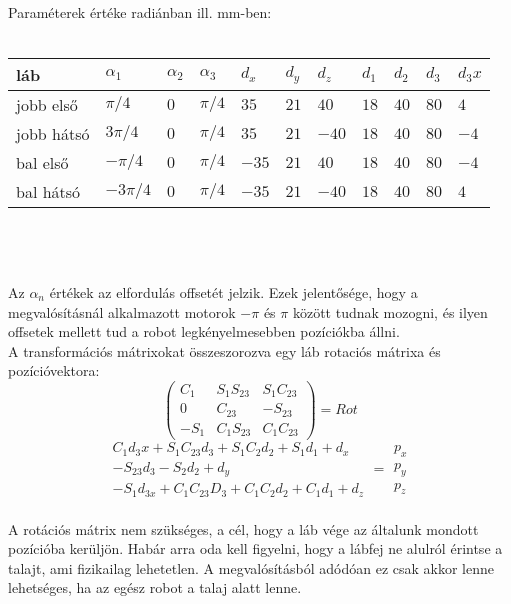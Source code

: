 \documentclass{article}
\begin{document}
	Paraméterek értéke radiánban ill. mm-ben:\\
	\\
	\begin{tabular}{ | l | l | l | l | l | l | l | l | l | l | l |}
		\hline
		láb&$\alpha_1$&$\alpha_2$&$\alpha_3$&$d_x$&$d_y$&$d_z$&$d_1$&$d_2$&$d_3$&$d_3x$\\
		\hline
		jobb első&$\pi/4$&$0$&$\pi/4$&$35$&$21$&$40$&$18$&$40$&$80$&$4$\\
		\hline
		jobb hátsó&$3\pi/4$&$0$&$\pi/4$&$35$&$21$&$-40$&$18$&$40$&$80$&$-4$\\
		\hline
		bal első&$-\pi/4$&$0$&$\pi/4$&$-35$&$21$&$40$&$18$&$40$&$80$&$-4$\\
		\hline
		bal hátsó&$-3\pi/4$&$0$&$\pi/4$&$-35$&$21$&$-40$&$18$&$40$&$80$&$4$\\
		\hline
	\end{tabular}\\
	\\
	\\
	Az $\alpha_n$ értékek az elfordulás offsetét jelzik. Ezek jelentősége, hogy a megvalósításnál alkalmazott motorok $-\pi$ és $\pi$ között tudnak mozogni, és ilyen offsetek mellett tud a robot legkényelmesebben pozíciókba állni.\\
	A transformációs mátrixokat összeszorozva egy láb rotaciós mátrixa és pozícióvektora:
	$$
	\begin{pmatrix}
	C_1&S_1S_{23}&S_1C_{23}\\
	0&C_{23}&-S_{23}\\
	-S_1&C_1S_{23}&C_1C_{23}
	\end{pmatrix}
	=
	Rot
	$$
	$$
	\begin{matrix}
	C_1d_3x+S_1C_{23}d_3+S_1C_2d_2+S_1d_1+d_x\\
	-S_{23}d_3-S_2d_2+d_y\\
	-S_1d_{3x}+C_1C_{23}D_3+C_1C_2d_2+C_1d_1+d_z
	\end{matrix}
	=
	\begin{matrix}
	p_x\\
	p_y\\
	p_z
	\end{matrix}
	$$
	\\
	A rotációs mátrix nem szükséges, a cél, hogy a láb vége az általunk mondott pozícióba kerüljön. Habár arra oda kell figyelni, hogy a lábfej ne alulról érintse a talajt, ami fizikailag lehetetlen. A megvalósításból adódóan ez csak akkor lenne lehetséges, ha az egész robot a talaj alatt lenne.
	
	
\end{document}
